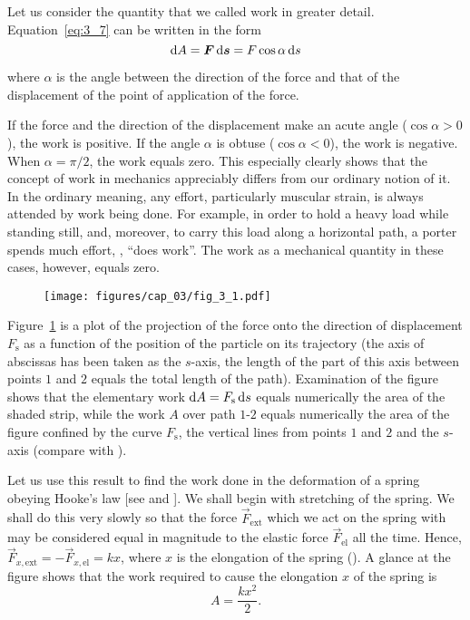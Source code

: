 Let us consider the quantity that we called work in greater detail. Equation~\eqref{eq:3_7} can be written in the form
\begin{equation}\label{eq:3_12}
\mathrm{d}A = \boldsymbol{F}\,\mathrm{d}\boldsymbol{s} = F\cos\alpha\,\mathrm{d} s
\end{equation}

\noindent
where $\alpha$ is the angle between the direction of the force and that of the displacement of the point of application of the force.

If the force and the direction of the displacement make an
acute angle ($\cos\alpha>0$), the work is positive. If the angle $\alpha$ is obtuse ($\cos\alpha<0$), the work is negative. When $\alpha=\pi/2$, the work equals zero. This especially clearly shows that the concept of work in mechanics appreciably differs from our ordinary notion of it. In the ordinary meaning, any effort, particularly muscular strain, is always attended by work being done. For example, in order to hold a heavy load while standing still, and, moreover, to carry this load along a horizontal path, a porter spends much effort, \ie, ``does work''. The work as a mechanical quantity in these cases, however, equals zero.

\begin{figure}[t]
	\begin{center}
		\texttt{[image: figures/cap\_03/fig\_3\_1.pdf]}
		\caption[]{}
		\label{fig:3_1}
	\end{center}
	\vspace{-0.7cm}
\end{figure}

Figure~\ref{fig:3_1} is a plot of the projection of the force onto the direction of displacement $F_{\text{s}}$ as a function of the position of the particle on its trajectory (the axis of abscissas has been taken as the $s$-axis, the length of the part of this axis between points $1$ and $2$ equals the total length of the path). Examination of the figure shows that the elementary work $\mathrm{d} A=F_{\text{s}}\,\mathrm{d} s$ equals numerically the area of the shaded strip, while the work $A$ over path $1$-$2$ equals numerically the area of the figure confined by the curve $F_{\text{s}}$, the vertical lines from points $1$ and $2$ and the $s$-axis (compare with ).

Let us use this result to find the work done in the deformation of a spring obeying Hooke's law [see  and ]. We shall begin with stretching of the spring. We shall do this very slowly so that the force $\vec{F}_{\text{ext}}$ which we act on the spring with may be considered equal in magnitude to the elastic force $\vec{F}_{\text{el}}$ all the time. Hence, $\vec{F}_{x,\text{ext}}=-\vec{F}_{x,\text{el}}=kx$, where $x$ is the elongation of the spring (). A glance at the figure shows that the work required to cause the elongation $x$ of the spring is
\begin{equation}\label{eq:3_13}
A = \frac{kx^2}{2}.
\end{equation}

